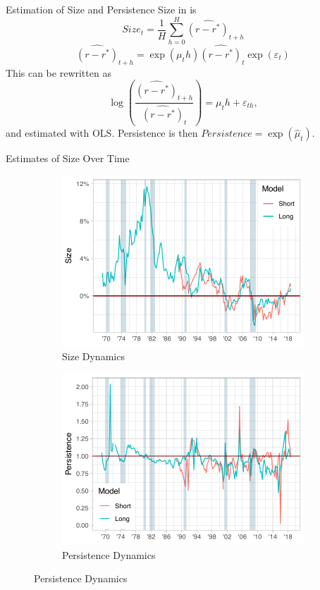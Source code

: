 \documentclass[10pt,aspectratio=169]{beamer}
\begin{document}
\begin{frame}{Estimation of Size and Persistence}
Size in \cite{KMV2018} is 
\[\mathit{Size}_t=\frac{1}{H}\sum_{h=0}^H \widehat{\left(r-r^*\right)}_{t+h}\]
\[\widehat{\left(r-r^*\right)}_{t+h}=\exp(\mu_t h)\widehat{\left(r-r^*\right)}_t\exp(\varepsilon_t)\]
This can be rewritten as 
\[\log\left(\frac{\widehat{\left(r-r^*\right)}_{t+h}}{\widehat{\left(r-r^*\right)}_{t}}\right)=\mu_t h+\varepsilon_{th},\]
and estimated with OLS. Persistence is then $\mathit{Persistence}=\exp(\hat{\mu}_t)$.
\end{frame}


\begin{frame}{Estimates of Size Over Time}
    \begin{figure}[!htbp]\centering
        \caption{}
        \label{fig:Size_Persistence_Dynamics}
        \begin{subfigure}[b]{0.49\textwidth}\centering
            \caption{Size Dynamics}
            \label{fig:AverageResponce}
            \includegraphics[width=\linewidth]{size_plot.pdf}
        \end{subfigure}%
        \begin{subfigure}[b]{0.49\textwidth}\centering
            \caption{Persistence Dynamics}
            \label{fig:DifferentialResponce}
            \includegraphics[width=\linewidth]{persistence_plot.pdf}

\end{subfigure}
\end{figure}
\end{frame}
\end{document}
